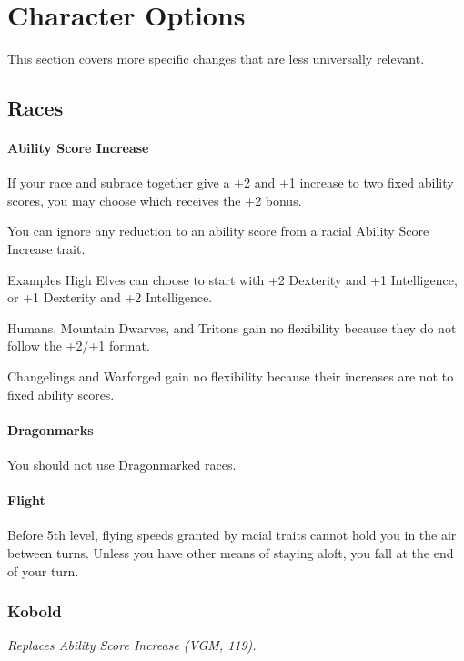 \documentclass[House_Rules.tex]{subfiles}
\begin{document}
\chapter{Character Options}

This section covers more specific changes that are less universally relevant.




\section{Races}

\subsubsection{Ability Score Increase}
If your race and subrace together give a +2 and +1 increase to two fixed ability scores, you may choose which receives the +2 bonus.

You can ignore any reduction to an ability score from a racial Ability Score Increase trait.

\begin{DndComment}{Examples}
High Elves can choose to start with +2 Dexterity and +1 Intelligence, or +1 Dexterity and +2 Intelligence. 

Humans, Mountain Dwarves, and Tritons gain no flexibility because they do not follow the +2/+1 format.

Changelings and Warforged gain no flexibility because their increases are not to fixed ability scores.
\end{DndComment}


\subsubsection{Dragonmarks} You should not use Dragonmarked races.

\subsubsection{Flight} Before 5th level, flying speeds granted by racial traits cannot hold you in the air between turns. Unless you have other means of staying aloft, you fall at the end of your turn.

\subsection{Kobold}
\textit{Replaces Ability Score Increase (VGM, 119).}
\end{document}
